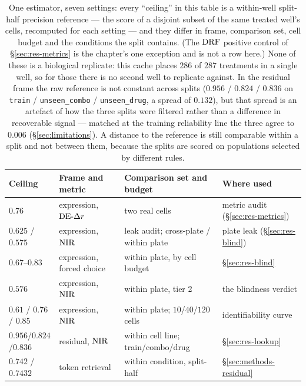 \begin{table}[htbp]
\centering
\footnotesize
\begin{tabularx}{\textwidth}{@{}>{\raggedright\arraybackslash}p{}
  >{\raggedright\arraybackslash}p{}
  >{\raggedright\arraybackslash}p{}X@{}}
\toprule
Ceiling & Frame and metric & Comparison set and budget & Where used \\
\midrule
$0.76$ & expression, $\textrm{DE-}\Delta r$ & two real cells & metric audit (\S\ref{sec:res-metrics}) \\
$0.625$ / $0.575$ & expression, $\textrm{NIR}$ & leak audit; cross-plate / within plate & plate leak (\S\ref{sec:res-blind}) \\
$0.67$--$0.83$ & expression, forced choice & within plate, by cell budget & \S\ref{sec:res-blind} \\
$0.576$ & expression, $\textrm{NIR}$ & within plate, tier 2 & the blindness verdict \\
$0.61$ / $0.76$ / $0.85$ & expression, $\textrm{NIR}$ & within plate; $10$/$40$/$120$ cells & identifiability curve \\
$0.956$/$0.824$/$0.836$ & residual, $\textrm{NIR}$ & within cell line; train/combo/drug & \S\ref{sec:res-lookup} \\
$0.742$ / $0.7432$ & token retrieval & within condition, split-half & \S\ref{sec:methods-residual} \\
\bottomrule
\end{tabularx}
\caption{One estimator, seven settings: every ``ceiling'' in this table is a within-well
split-half precision reference --- the score of a disjoint subset of the same treated well's cells,
recomputed for each setting --- and they differ in frame, comparison set, cell budget and the
conditions the split contains. (The $\textrm{DRF}$ positive control of \S\ref{sec:res-metrics} is the
chapter's one exception and is not a row here.) None of these is a biological replicate: this cache
places $286$ of $287$ treatments in a single well, so for those there is no second well to replicate
against. In the residual frame the raw reference is not constant across splits ($0.956$ / $0.824$ /
$0.836$ on \texttt{train} / \texttt{unseen\_combo} / \texttt{unseen\_drug}, a spread of
$0.132$), but that spread is an artefact of how the three splits were filtered rather than a
difference in recoverable signal --- matched at the training reliability line the three agree to
$0.006$ (\S\ref{sec:limitations}). A distance to the reference is still comparable within a split
and not between them, because the splits are scored on populations selected by different rules.}
\label{tab:ceilings}
\end{table}

